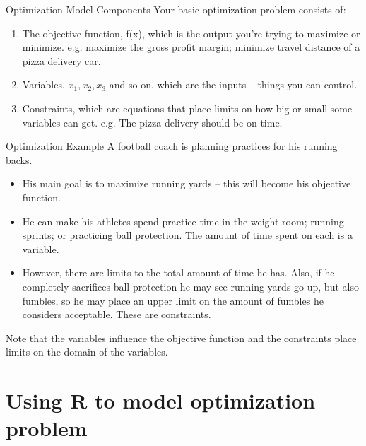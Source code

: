 \documentclass[xcolor=dvipsnames,aspectratio=169]{beamer}
\begin{document}
\begin{frame}{Optimization Model Components}
Your basic optimization problem consists of: 
\begin{enumerate}
    \item The objective function, {\color{red} f(x)}, which is the output you’re trying to maximize or minimize. e.g. maximize the gross profit margin; minimize travel distance of a pizza delivery car. 
    
    \item  Variables,  {\color{red}$x_1, x_2, x_3$} and so on, which are the inputs – things you can control. 
    
    \item Constraints, which are equations that place limits on how big or small some variables can get. e.g. The pizza delivery should be on time.
    
    
\end{enumerate}


\end{frame}


\begin{frame}{Optimization Example}
    A football coach is planning practices for his running backs.
\begin{itemize}
    \item His main goal is to maximize running yards – this will become his
    {\color{red} objective function}.
    
    \item He can make his athletes spend practice time in the weight room; running 
    sprints; or practicing ball protection. The amount of time spent on each is a 
    {\color{red} variable}.
    
    \item  However, there are limits to the total amount of time he has. Also, if he
    completely sacrifices ball protection he may see running yards go up, but also 
    fumbles, so he may place an upper limit on the amount of fumbles he considers 
    acceptable. These are {\color{red} constraints}.
\end{itemize}

Note that the variables influence the objective function and the constraints place limits on the domain of the variables.
\end{frame}


\section{Using R to model optimization problem}
\end{document}
